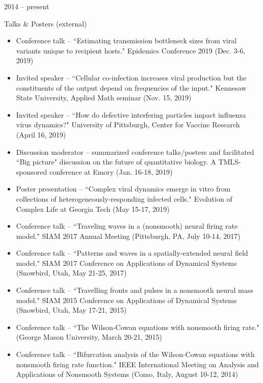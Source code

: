 \documentclass[a4paper,10pt]{article}
\newlength{\cvcolumngapwidth}
\newlength{\cvleftcolumnwidth}
\newlength{\cvrightcolumnwidth}
\newcommand{\cvtitlestyle}[1]{{\large\cvtitlefont\textcolor{cvtitlecolor}{#1}}}
\newcommand{\cvheadingstyle}[1]{{\normalsize\cvheadingfont\textcolor{cvheadingcolor}{#1}}}
\newlength{\cvafteritemskipamount}
\newlength{\cvaftertitleskipamount}
\newlength{\cvparskip}
\newcommand{\cvitem}[2]{
    \begin{minipage}[t]{\cvleftcolumnwidth}
        \raggedleft #1
    \end{minipage}%
    \hspace{\cvcolumngapwidth}%
    \begin{minipage}[t]{\cvrightcolumnwidth}
        \setlength{\parskip}{\cvparskip} #2
    \end{minipage}

    \vspace{\cvafteritemskipamount}
}
\newcommand{\cvtitle}[1]{
    \cvtitlestyle{#1}

    \vspace{\cvaftertitleskipamount}
    \vspace{-\cvparskip}
}
\begin{document}
\cvitem{
    \cvheadingstyle{2014 -- present}
}{

    \cvtitle{Talks \& Posters (external)}
    \begin{itemize}[leftmargin=*]
    	\item Conference talk -- ``Estimating transmission bottleneck sizes from viral variants unique to recipient hosts." Epidemics Conference 2019 (Dec. 3-6, 2019) \\
        \item Invited speaker -- ``Cellular co-infection increases viral production but the constituents of the output depend on frequencies of the input." Kennesaw State University, Applied 	Math seminar (Nov. 15, 2019) \\
       	\item Invited speaker -- ``How do defective interfering particles impact influenza virus dynamics?" University of Pittsburgh, Center for Vaccine Research (April 16, 2019) \\
        \item Discussion moderator -- summarized conference talks/posters and facilitated ``Big picture" discussion on the future of quantitative biology. A TMLS-sponsored conference at Emory (Jan. 16-18, 2019) \\

        \item Poster presentation -- ``Complex viral dynamics emerge in vitro from collections of heterogeneously-responding infected cells." Evolution of Complex Life at Georgia Tech (May 15-17, 2019) \\
    \end{itemize}
    
    \begin{itemize}[leftmargin=*]
    	\item Conference talk -- ``Traveling waves in a (nonsmooth) neural firing rate model." SIAM 2017 Annual Meeting (Pittsburgh, PA, July 10-14, 2017) \\
	\item Conference talk -- ``Patterns and waves in a spatially-extended neural field model." SIAM 2017 Conference on Applications of Dynamical Systems \\(Snowbird, Utah, May 21-25, 2017) \\
    	\item Conference talk -- ``Travelling fronts and pulses in a nonsmooth neural mass model." SIAM 2015 Conference on Applications of Dynamical Systems \\(Snowbird, Utah, May 17-21, 2015) \\
	\item Conference talk -- ``The Wilson-Cowan equations with nonsmooth firing rate." (George Mason University, March 20-21, 2015) \\
	\item Conference talk --  ``Bifurcation analysis of the Wilson-Cowan equations with nonsmooth firing rate function." IEEE International Meeting on Analysis and Applications of Nonsmooth Systems (Como, Italy, August 10-12, 2014) \\
    \end{itemize}
}
\end{document}

